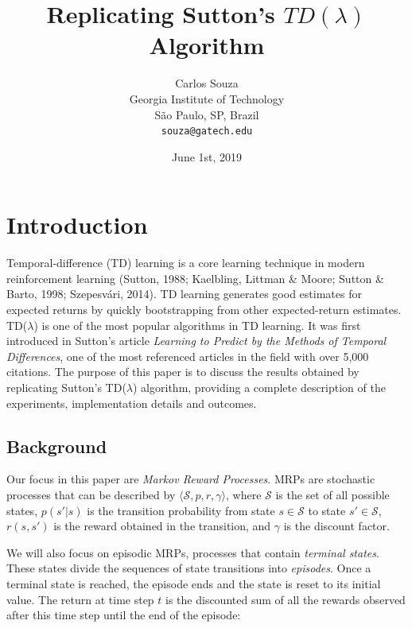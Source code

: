 \documentclass{article}
\title{Replicating Sutton's $TD(\lambda)$ Algorithm}
\date{June 1st, 2019}	%
\author{
  Carlos Souza\\
  Georgia Institute of Technology\\
  São Paulo, SP, Brazil \\
  \texttt{souza@gatech.edu} \\
}
\begin{document}
\maketitle

\begin{abstract}
\lipsum[1]
\end{abstract}




\section{Introduction}
\label{sec:introduction}
Temporal-difference (TD) learning is a core learning technique in modern reinforcement learning  (Sutton, 1988; Kaelbling, Littman \& Moore; Sutton \& Barto, 1998; Szepesvári, 2014).
TD learning generates good estimates for expected returns by quickly bootstrapping from other expected-return estimates. TD($\lambda$) is one of the most popular algorithms in TD learning.
It was first introduced in Sutton's article \emph{Learning to Predict by the Methods of Temporal Differences}, one of the most referenced articles in the field with over 5,000 citations.
The purpose of this paper is to discuss the results obtained by replicating Sutton's TD($\lambda$) algorithm, providing a complete description of the experiments, implementation details and outcomes.

\subsection{Background}
\label{subsec:background}
Our focus in this paper are \emph{Markov Reward Processes}.
MRPs are stochastic processes that can be described by \(\langle\mathcal{S}, p, r, \gamma\rangle\), where \(\mathcal{S}\) is the set of all possible states, \(p(s'|s)\) is the transition probability from state \(s \in \mathcal{S}\) to state \(s' \in \mathcal{S}\), \(r(s, s')\) is the reward obtained in the transition, and \(\gamma\) is the discount factor.

We will also focus on episodic MRPs, processes that contain \emph{terminal states}.
These states divide the sequences of state transitions into \emph{episodes}.
Once a terminal state is reached, the episode ends and the state is reset to its initial value.
The return at time step \(t\) is the discounted sum of all the rewards observed after this time step until the end of the episode:
\end{document}
